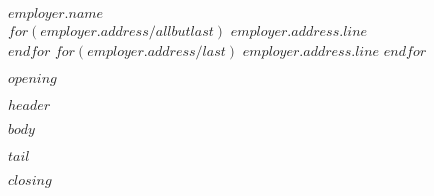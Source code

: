 \documentclass[$output.font_size$,$output.paper_size$]{letter}
\begin{document}
 
\begin{letter}{$employer.name$ \\ $for(employer.address/allbutlast)$ $employer.address.line$ \\ $endfor$ $for(employer.address/last)$ $employer.address.line$ $endfor$} 
\opening{$opening$} 

\indent $header$

\indent $body$

\indent $tail$

\closing{$closing$ \\
 \\
}
 
\end{letter} 
\end{document}
